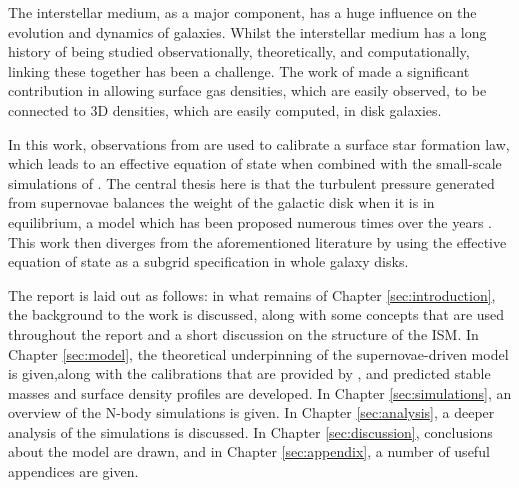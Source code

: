 The interstellar medium, as a major component, has a huge influence on the evolution and dynamics of galaxies.
Whilst the interstellar medium has a long history of being studied observationally, theoretically, and computationally, linking these together has been a challenge.
The work of \citet{schaye_star_2004} made a significant contribution in allowing surface gas densities, which are easily observed, to be connected to 3D densities, which are easily computed, in disk galaxies.

In this work, observations from \citet{bigiel_star_2008} are used to calibrate a surface star formation law, which leads to an effective equation of state when combined with the small-scale simulations of \citet{martizzi_supernova_2015}.
The central thesis here is that the turbulent pressure generated from supernovae balances the weight of the galactic disk when it is in equilibrium, a model which has been proposed numerous times over the years \citep{silk_feedback_1997, ostriker_maximally_2011, faucher-giguere_feedback-regulated_2013, martizzi_supernova_2016}.
This work then diverges from the aforementioned literature by using the effective equation of state as a subgrid specification in whole galaxy disks.

The report is laid out as follows: in what remains of Chapter \ref{sec:introduction}, the background to the work is discussed, along with some concepts that are used throughout the report and a short discussion on the structure of the ISM.
In Chapter \ref{sec:model}, the theoretical underpinning of the supernovae-driven model is given,along with the calibrations that are provided by \citet{martizzi_supernova_2015}, and predicted stable masses and surface density profiles are developed.
In Chapter \ref{sec:simulations}, an overview of the N-body simulations is given.
In Chapter \ref{sec:analysis}, a deeper analysis of the simulations is discussed.
In Chapter \ref{sec:discussion}, conclusions about the model are drawn, and in Chapter \ref{sec:appendix}, a number of useful appendices are given.
